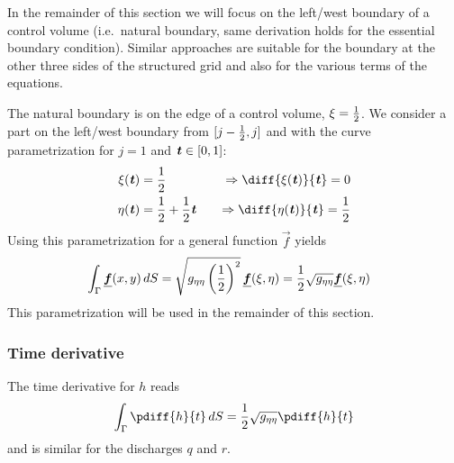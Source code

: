 In the remainder of this section we will focus on the left/west boundary of a control volume (i.e.\ natural boundary, same derivation holds for the essential boundary condition).
Similar approaches are suitable for the boundary at the other three sides of the structured grid and also for the various terms of the equations.

The natural boundary is on the edge of a control volume, $\xi = \frac{1}{2}$.
We consider a part on the left/west boundary from $[j - \frac{1}{2}, j]$ and with the curve parametrization for $j = 1$ and $\textbf{\textit{t}} \in [0,1]$:
%
\begin{alignat}{3}
    \begin{aligned}
    \xi(\paramt) &= \half      &\quad \Rightarrow \diff{\xi(\paramt)}{\paramt} = 0 \\
    \eta(\paramt) &= \half + \half \paramt &\quad \Rightarrow \diff{\eta(\paramt)}{\paramt} = \half
    \end{aligned}
    \label{eq:parametrization}
\end{alignat}
Using this parametrization for a general function $\vec{f}$ yields
\begin{align}
    &\int_\Gamma  \mbox{\boldmath $\underline{f}$}(x,y)\, dS
    = \sqrt{g_{\eta\eta} \left(\frac{1}{2}\right)^2} \,\mbox{\boldmath $\underline{f}$}(\xi,\eta)
    = \frac{1}{2} \sqrt{g_{\eta\eta}} \mbox{\boldmath $\underline{f}$}(\xi,\eta)
\end{align}
%
This parametrization will be used in the remainder of this section.

\subsubsection{Time derivative}
The time derivative for $h$ reads
\begin{align}
    \int_\Gamma \pdiff{h}{t} \, dS = \half \sqrt{g_{\eta\eta}} \pdiff{h}{t}
\end{align}
and is similar for the discharges $q$ and $r$.

